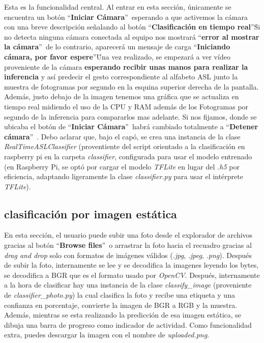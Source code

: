 
Esta es la funcionalidad central. Al entrar en esta sección, únicamente se encuentra un botón ``\textbf{Iniciar Cámara}''\ esperando a que activemos la cámara con una breve descripción señalando al botón ``\textbf{Clasificación en tiempo real}''\. Si no detecta ninguna cámara conectada al equipo nos mostrará ``\textbf{error al mostrar la cámara}''\, de lo contrario, aparecerá un mensaje de carga ``\textbf{Iniciando cámara, por favor espere}''\. Una vez realizado, se empezará a ver vídeo proveniente de la cámara \textbf{esperando recibir unas manos para realizar la inferencia} y así predecir el gesto correspondiente al alfabeto ASL junto la muestra de fotogramas por segundo en la esquina superior derecha de la pantalla. Además, justo debajo de la imagen tenemos una gráfica que se actualiza en tiempo real midiendo el uso de la CPU y RAM además de los Fotogramas por segundo de la inferencia para compararlos mas adelante. Si nos fijamos, donde se ubicaba el botón de ``\textbf{Iniciar Cámara}''\, habrá cambiado totalmente a ``\textbf{Detener cámara}''\ . Debo aclarar que, bajo el capó, se crea una instancia de la clase \textit{RealTimeASLClassifier} (proventiente del script orientado a la clasificación en raspberry pi en la carpeta \textit{classifier}, configurada para usar el modelo entrenado (en Raspberry Pi, se optó por cargar el modelo \textit{TFLite} en lugar del \textit{.h5} por eficiencia, adaptando ligeramente la clase \textit{classifier.py} para usar el intérprete \textit{TFLite}). 

\subsection{\textbf{clasificación por imagen estática}}


En esta sección, el usuario puede subir una foto desde el explorador de archivos gracias al botón ``\textbf{Browse files}''\ o arrastrar la foto hacia el recuadro gracias al \textit{drag and drop} solo con formatos de imágenes válidos (\textit{.jpg}, \textit{.jpeg}, \textit{.png}). Después de subir la foto, internamente se lee y se decodifica la imagenes leyendo los bytes, se decodifica a BGR que es el formato usado por \textit{OpenCV}. Después, internamente a la hora de clasificar hay una instancia de la clase \textit{classify\_image} (proveniente de \textit{classifier\_photo.py}) la cual clasifica la foto y recibe una etiqueta y una confianza en porcentaje, convierte la imagen de BGR a RGB y la muestra. Además, mientras se esta realizando la predicción de esa imagen estática, se dibuja una barra de progreso como indicador de actividad. Como funcionalidad extra, puedes descargar la imagen con el nombre de \textit{uploaded.png}.


